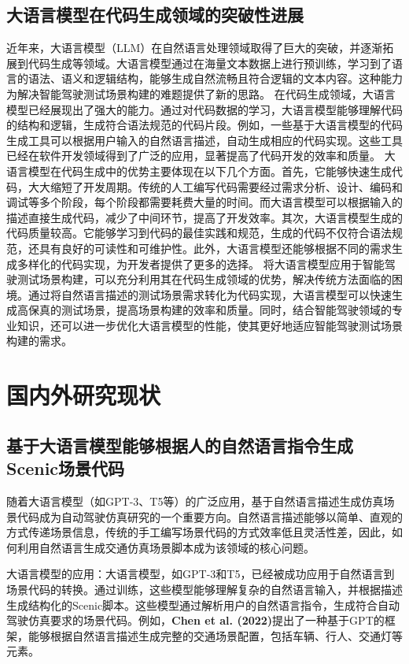 \subsection{大语言模型在代码生成领域的突破性进展}
近年来，大语言模型（LLM）在自然语言处理领域取得了巨大的突破，并逐渐拓展到代码生成等领域。大语言模型通过在海量文本数据上进行预训练，学习到了语言的语法、语义和逻辑结构，能够生成自然流畅且符合逻辑的文本内容。这种能力为解决智能驾驶测试场景构建的难题提供了新的思路。
在代码生成领域，大语言模型已经展现出了强大的能力。通过对代码数据的学习，大语言模型能够理解代码的结构和逻辑，生成符合语法规范的代码片段。例如，一些基于大语言模型的代码生成工具可以根据用户输入的自然语言描述，自动生成相应的代码实现。这些工具已经在软件开发领域得到了广泛的应用，显著提高了代码开发的效率和质量。
大语言模型在代码生成中的优势主要体现在以下几个方面。首先，它能够快速生成代码，大大缩短了开发周期。传统的人工编写代码需要经过需求分析、设计、编码和调试等多个阶段，每个阶段都需要耗费大量的时间。而大语言模型可以根据输入的描述直接生成代码，减少了中间环节，提高了开发效率。其次，大语言模型生成的代码质量较高。它能够学习到代码的最佳实践和规范，生成的代码不仅符合语法规范，还具有良好的可读性和可维护性。此外，大语言模型还能够根据不同的需求生成多样化的代码实现，为开发者提供了更多的选择。
将大语言模型应用于智能驾驶测试场景构建，可以充分利用其在代码生成领域的优势，解决传统方法面临的困境。通过将自然语言描述的测试场景需求转化为代码实现，大语言模型可以快速生成高保真的测试场景，提高场景构建的效率和质量。同时，结合智能驾驶领域的专业知识，还可以进一步优化大语言模型的性能，使其更好地适应智能驾驶测试场景构建的需求。



	
\section{国内外研究现状}
\subsection{基于大语言模型能够根据人的自然语言指令生成Scenic场景代码}
	随着大语言模型（如GPT-3、T5等）的广泛应用，基于自然语言描述生成仿真场景代码成为自动驾驶仿真研究的一个重要方向。自然语言描述能够以简单、直观的方式传递场景信息，传统的手工编写场景代码的方式效率低且灵活性差，因此，如何利用自然语言生成交通仿真场景脚本成为该领域的核心问题。
	
	大语言模型的应用：大语言模型，如GPT-3和T5，已经被成功应用于自然语言到场景代码的转换。通过训练，这些模型能够理解复杂的自然语言输入，并根据描述生成结构化的Scenic脚本。这些模型通过解析用户的自然语言指令，生成符合自动驾驶仿真要求的场景代码。例如，\textbf{Chen et al. (2022)}提出了一种基于GPT的框架，能够根据自然语言描述生成完整的交通场景配置，包括车辆、行人、交通灯等元素。
	
